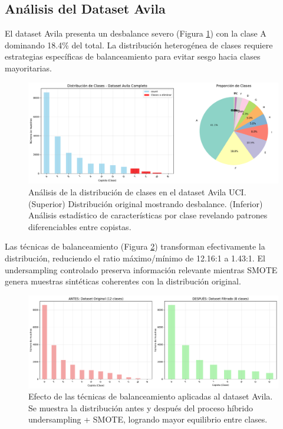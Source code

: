 \documentclass[12pt,a4paper]{article}
\begin{document}
\subsection{Análisis del Dataset Avila}

El dataset Avila presenta un desbalance severo (Figura \ref{fig:distribucion_avila}) con la clase A dominando 18.4\% del total. La distribución heterogénea de clases requiere estrategias específicas de balanceamiento para evitar sesgo hacia clases mayoritarias.

\begin{figure}[H]
    \centering
    \includegraphics[width=\textwidth]{figures/figura_06_distribucion_avila.pdf}
    \caption{Análisis de la distribución de clases en el dataset Avila UCI. (Superior) Distribución original mostrando desbalance. (Inferior) Análisis estadístico de características por clase revelando patrones diferenciables entre copistas.}
    \label{fig:distribucion_avila}
\end{figure}

Las técnicas de balanceamiento (Figura \ref{fig:balanceamiento}) transforman efectivamente la distribución, reduciendo el ratio máximo/mínimo de 12.16:1 a 1.43:1. El undersampling controlado preserva información relevante mientras SMOTE genera muestras sintéticas coherentes con la distribución original.

\begin{figure}[H]
    \centering
    \includegraphics[width=\textwidth]{figures/figura_07_tecnicas_balanceamiento.pdf}
    \caption{Efecto de las técnicas de balanceamiento aplicadas al dataset Avila. Se muestra la distribución antes y después del proceso híbrido undersampling + SMOTE, logrando mayor equilibrio entre clases.}
    \label{fig:balanceamiento}
\end{figure}
\end{document}
